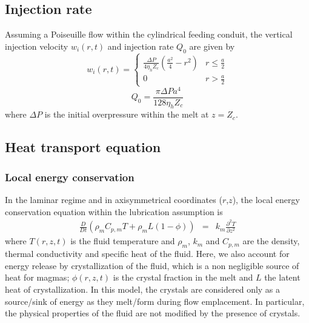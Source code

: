 \subsection{Injection rate}

Assuming a Poiseuille flow within the cylindrical feeding conduit, the
vertical injection  velocity $w_i(r,t)$  and injection rate  $Q_0$ are
given by
\begin{equation}
  w_i(r,t)=
  \begin{cases}
    \frac{ \Delta P}{4 \eta_h Z_{c}} (\frac{a^{2}}{4}-r^{2})& r \le \frac{a}{2}\\
    0 & r > \frac{a}{2}
  \end{cases}
  \label{C3-eq12}
\end{equation}
\begin{equation}
  Q_{0}=\frac{\pi \Delta P a^{4}}{128 \eta_h Z_c}
  \label{C3-eq11}
\end{equation}
where  $\Delta P$  is  the  initial overpressure  within  the melt  at
$z=Z_{c}$.

\subsection{Heat transport equation}
\subsubsection{Local energy conservation}

In the laminar regime and in axisymmetrical coordinates ($r$,$z$), the
local energy  conservation equation within the  lubrication assumption
is
\begin{eqnarray}
  \frac{D}{D t}\left(\rho_m C_{p,m} T+\rho_mL(1-\phi)\right)&=& k_m  \frac{\partial^2
                                                                T}{\partial               z^2}\label{C3-EnergyCons}
\end{eqnarray}
where  $T(r,z,t)$ is  the fluid  temperature and  $\rho_m$, $k_m$  and
$C_{p,m}$ are the  density, thermal conductivity and  specific heat of
the   fluid.   Here,   we   also  account   for   energy  release   by
crystallization of the fluid, which is a non negligible source of heat
for magmas; $\phi(r,z,t)$ is the crystal  fraction in the melt and $L$
the latent heat  of crystallization.  In this model,  the crystals are
considered only  as a source/sink  of energy as they  melt/form during
flow emplacement.  In particular, the physical properties of the fluid
are not modified by the presence of crystals.


